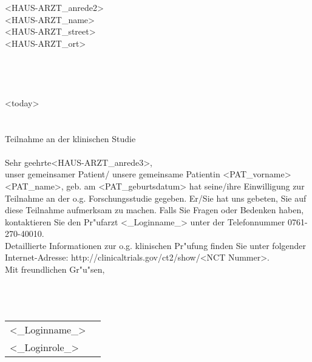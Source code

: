 \documentclass{scrreprt}
\begin{document}
\baselineskip15pt
\setlength{\headheight}{7\baselineskip}
\setlength{\oddsidemargin}{-3mm} 
\addtolength{\textwidth}{2cm}

\noindent <HAUS-ARZT_anrede2>\\
\noindent <HAUS-ARZT_name>\\
\noindent <HAUS-ARZT_street> \\
\noindent <HAUS-ARZT_ort> \\
\\ \\ 
\\ \\ 

\hspace{12.5cm} <today>\\ \\ \\ 

\noindent Teilnahme an der klinischen Studie {\it <Voller Titel>}\\ \\

\noindent  Sehr geehrte<HAUS-ARZT_anrede3>,\\

\noindent unser gemeinsamer Patient/ unsere gemeinsame Patientin <PAT_vorname> <PAT_name>, geb. am <PAT_geburtsdatum> hat seine/ihre Einwilligung zur Teilnahme an der o.g. Forschungsstudie gegeben. Er/Sie hat uns gebeten, Sie auf diese Teilnahme aufmerksam zu machen. Falls Sie Fragen oder Bedenken haben, kontaktieren Sie den Pr"ufarzt <_Loginname_> unter der Telefonnummer 0761-270-40010.\\

\noindent Detaillierte Informationen zur o.g. klinischen Pr"ufung finden Sie unter folgender Internet-Adresse: http://clinicaltrials.gov/ct2/show/<NCT Nummer>.\\

\noindent Mit freundlichen Gr"u"sen, \\ \\   \\ \\

\hspace*{-7mm}  \begin{tabularx}{20cm}{XX}
<_Loginname_>\\ 
<_Loginrole_> \\ 
\end{tabularx}
\end{document}
